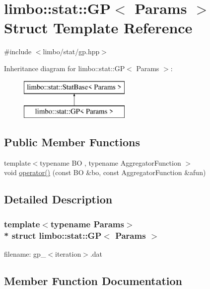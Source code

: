 \hypertarget{structlimbo_1_1stat_1_1_g_p}{}\section{limbo\+:\+:stat\+:\+:GP$<$ Params $>$ Struct Template Reference}
\label{structlimbo_1_1stat_1_1_g_p}


{\ttfamily \#include $<$limbo/stat/gp.\+hpp$>$}

Inheritance diagram for limbo\+:\+:stat\+:\+:GP$<$ Params $>$\+:\begin{figure}[H]
\begin{center}
\leavevmode
\includegraphics[height=2.000000cm]{structlimbo_1_1stat_1_1_g_p}
\end{center}
\end{figure}
\subsection*{Public Member Functions}
\begin{DoxyCompactItemize}
\item 
{\footnotesize template$<$typename BO , typename Aggregator\+Function $>$ }\\void \hyperlink{structlimbo_1_1stat_1_1_g_p_ae1af2dda46c2aaca5f757871b038694e}{operator()} (const BO \&bo, const Aggregator\+Function \&afun)
\end{DoxyCompactItemize}


\subsection{Detailed Description}
\subsubsection*{template$<$typename Params$>$\\*
struct limbo\+::stat\+::\+G\+P$<$ Params $>$}

filename\+: {\ttfamily gp\+\_\+$<$iteration$>$.dat} 

\subsection{Member Function Documentation}

